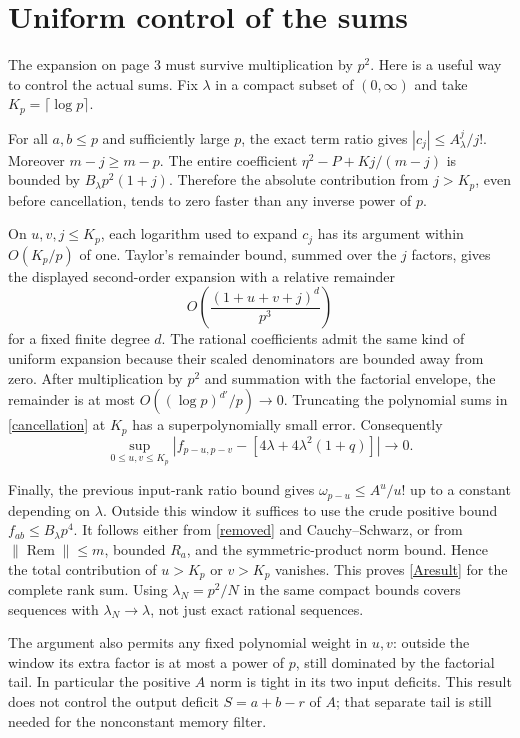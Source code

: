 \documentclass[11pt,a4paper]{article}
\newcommand{\Rem}{\operatorname{Rem}}
\begin{document}
\newpage
\section{Uniform control of the sums}
The expansion on page 3 must survive multiplication by $p^2$.
Here is a useful way to control the actual sums. Fix $\lambda$ in
a compact subset of $(0,\infty)$ and take
$K_p=\lceil\log p\rceil$.

For all $a,b\leq p$ and sufficiently large $p$, the exact term ratio
gives $|c_j|\leq A_\lambda^j/j!$. Moreover $m-j\geq m-p$.
The entire coefficient $\eta^2-P+Kj/(m-j)$ is bounded by
$B_\lambda p^2(1+j)$. Therefore the absolute contribution from
$j>K_p$, even before cancellation, tends to zero faster than any
inverse power of $p$.

On $u,v,j\leq K_p$, each logarithm used to expand $c_j$ has its
argument within $O(K_p/p)$ of one. Taylor's remainder bound,
summed over the $j$ factors, gives the displayed second-order
expansion with a relative remainder
\begin{equation}
 O\!\left(\frac{(1+u+v+j)^d}{p^3}\right)
\end{equation}
for a fixed finite degree $d$. The rational coefficients admit the
same kind of uniform expansion because their scaled denominators
are bounded away from zero. After multiplication by $p^2$ and
summation with the factorial envelope, the remainder is at most
$O((\log p)^{d'}/p)\to0$. Truncating the polynomial sums in
\eqref{cancellation} at $K_p$ has a superpolynomially small error.
Consequently
\begin{equation}
 \sup_{0\leq u,v\leq K_p}
 \left|f_{p-u,p-v}-[4\lambda+4\lambda^2(1+q)]\right|\to0.
\end{equation}

Finally, the previous input-rank ratio bound gives
$\omega_{p-u}\leq A^u/u!$ up to a constant depending on
$\lambda$. Outside this window it suffices to use the crude
positive bound $f_{ab}\leq B_\lambda p^4$. It follows either
from \eqref{removed} and Cauchy--Schwarz, or from
$\|\Rem\|\leq m$, bounded $R_a$, and the symmetric-product
norm bound. Hence the total contribution of $u>K_p$ or $v>K_p$
vanishes. This proves \eqref{Aresult} for the complete rank sum.
Using $\lambda_N=p^2/N$ in the same compact bounds covers sequences
with $\lambda_N\to\lambda$, not just exact rational sequences.

The argument also permits any fixed polynomial weight in $u,v$:
outside the window its extra factor is at most a power of $p$,
still dominated by the factorial tail. In particular the positive
$A$ norm is tight in its two input deficits. This result does not
control the output deficit $S=a+b-r$ of $A$; that separate tail is
still needed for the nonconstant memory filter.
\end{document}
